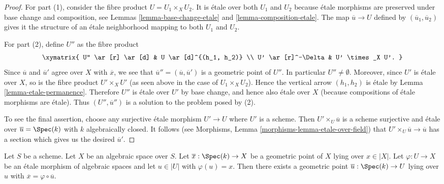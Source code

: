 \begin{proof}
For part (1), consider the fibre product $U = U_1 \times_X U_2$.
It is \'etale over both $U_1$ and $U_2$ because \'etale morphisms are
preserved under base change and composition, see
Lemmas \ref{lemma-base-change-etale} and \ref{lemma-composition-etale}.
The map $\overline{u} \to U$ defined by $(\overline{u}_1, \overline{u}_2)$
gives it the structure of an \'etale neighborhood mapping to both
$U_1$ and $U_2$.

\medskip\noindent
For part (2), define $U''$ as the fibre product
$$
\xymatrix{
U'' \ar[r] \ar[d] & U \ar[d]^{(h_1, h_2)} \\
U' \ar[r]^-\Delta & U' \times_X U'.
}
$$
Since $\overline{u}$ and $\overline{u}'$ agree over $X$ with $\overline{x}$,
we see that $\overline{u}'' = (\overline{u}, \overline{u}')$ is a geometric
point of $U''$. In particular $U'' \not = \emptyset$.
Moreover, since $U'$ is \'etale over $X$, so is the fibre product
$U'\times_X U'$ (as seen above in the case of $U_1 \times_X U_2$).
Hence the vertical arrow $(h_1, h_2)$ is \'etale by
Lemma \ref{lemma-etale-permanence}.
Therefore $U''$ is \'etale over $U'$ by base change, and hence also
\'etale over $X$ (because compositions of \'etale morphisms are \'etale).
Thus $(U'', \overline{u}'')$ is a solution to the problem posed by (2).

\medskip\noindent
To see the final assertion, choose any surjective \'etale morphism
$U' \to U$ where $U'$ is a scheme. Then
$U' \times_U \overline{u}$ is a scheme surjective and \'etale over
$\overline{u} = \Spec(k)$ with $k$ algebraically closed.
It follows (see
Morphisms, Lemma \ref{morphisms-lemma-etale-over-field})
that $U' \times_U \overline{u} \to \overline{u}$ has a section
which gives us the desired $\overline{u}'$.
\end{proof}

\begin{lemma}
\label{lemma-geometric-lift-to-usual}
Let $S$ be a scheme. Let $X$ be an algebraic space over $S$.
Let $\overline{x} : \Spec(k) \to X$ be a geometric point of $X$
lying over $x \in |X|$. Let $\varphi : U \to X$ be an \'etale morphism
of algebraic spaces and let $u \in |U|$ with $\varphi(u) = x$.
Then there exists a geometric point
$\overline{u} : \Spec(k) \to U$ lying over $u$ with
$\overline{x} = \varphi \circ \overline{u}$.
\end{lemma}

